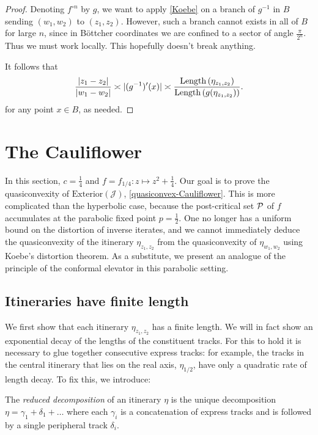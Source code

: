 \begin{proof}
Denoting $f^{\circ n}$ by $g$, 
we want to apply \cref{Koebe} on a branch of $g^{-1}$ in $B$ sending $(w_1,w_2)$ to $(z_1,z_2)$.
However, such a branch cannot exists in all of $B$ for large $n$, since in Böttcher coordinates
we are confined to a sector of angle $\frac \pi {2^n}$. Thus we must work locally. 
This hopefully doesn't break anything.

It follows that
\begin{equation}
	\frac {|z_1-z_2|}{|w_1-w_2|} \asymp |(g^{-1})'(x)| \asymp
	\frac{\operatorname{Length}\left(\eta_{z_{1},z_{2}}\right)}{\operatorname{Length}\left(g(\eta_{z_1,z_2})\right)}.
\end{equation}
for any point $x \in B$, as needed.
\end{proof}

\section{The Cauliflower}
In this section, $c=\frac 14$ and $f=f_{1/4}: z\mapsto z^2+ \frac 14$.
Our goal is to prove the quasiconvexity of $\mathrm{Exterior}(\mathcal{J})$, \cref{quasiconvex-Cauliflower}. 
This is more complicated than the hyperbolic case, 
because the post-critical set $\operatorname{\mathcal P}$ of $f$ accumulates at the parabolic fixed point $p=\frac 12$. 
One no longer has a uniform bound on the distortion of inverse iterates, 
and we cannot immediately deduce the quasiconvexity of the itinerary $\eta_{z_1,z_2}$ from the quasiconvexity of $\eta_{w_1,w_2}$ using Koebe's distortion theorem. 
As a substitute, we present an analogue of the principle of the conformal elevator in this parabolic setting.

\subsection{Itineraries have finite length}
We first show that each itinerary $\eta_{z_1,z_2}$ has a finite length. 
We will in fact show an exponential decay of the lengths of the constituent tracks. 
For this to hold it is necessary to glue together consecutive express tracks: 
for example, the tracks in the central itinerary that lies on the real axis, $\eta_{1/2}$, 
have only a quadratic rate of length decay. To fix this, we introduce:

\begin{definition}
	The \emph{reduced decomposition} of an itinerary $\eta$ is the unique decomposition $\eta=\gamma_1 + \delta_1 + \dots$ where each $\gamma_i$ is a concatenation of express tracks and is followed by a single peripheral track $\delta_i$.
\end{definition}

